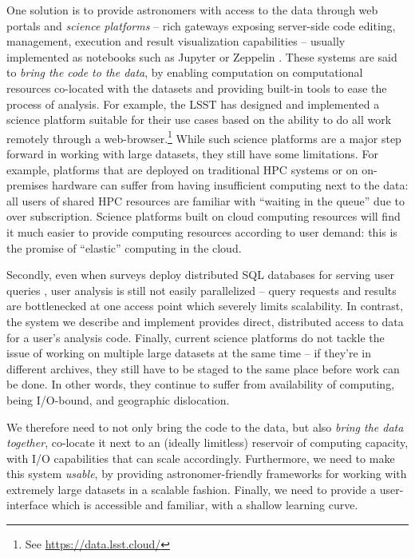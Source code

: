 \documentclass[twocolumn, linenumbers]{aastex631}
\begin{document}
One solution is to provide astronomers with access to the data through web portals and \textit{science platforms} -- rich gateways exposing server-side code editing, management, execution and result visualization capabilities -- usually implemented as notebooks such as Jupyter \citep{jupyter-notebooks} or Zeppelin \citep{zepplin}. These systems are said to {\em bring the code to the data}, by enabling computation on computational resources co-located with the datasets and providing built-in tools to ease the process of analysis. For example, the LSST has designed \citep{LSE-319, LDM-542} and implemented a science platform suitable for their use cases based on the ability to do all work remotely through a web-browser.\footnote{See \url{https://data.lsst.cloud/}} While such science platforms are a major step forward in working with large datasets, they still have some limitations. For example, platforms that are deployed on traditional HPC systems or on on-premises hardware can suffer from having insufficient computing next to the data: all users of shared HPC resources are familiar with ``waiting in the queue'' due to over subscription. Science platforms built on cloud computing resources will find it much easier to provide computing resources according to user demand: this is the promise of ``elastic'' computing in the cloud.

Secondly, even when surveys deploy distributed SQL databases for serving user queries \citep[e.g. Qserv in the case of LSST;][]{qserve}, user analysis is still not easily parallelized -- query requests and results are bottlenecked at one access point which severely limits scalability. In contrast, the system we describe and implement provides direct, distributed access to data for a user’s analysis code. Finally, current science platforms do not tackle the issue of working on multiple large datasets at the same time -- if they're in different archives, they still have to be staged to the same place before work can be done. In other words, they continue to suffer from availability of computing, being I/O-bound, and geographic dislocation.

We therefore need to not only bring the code to the data, but also {\em bring the data together}, co-locate it next to an (ideally limitless) reservoir of computing capacity, with I/O capabilities that can scale accordingly. Furthermore, we need to make this system {\em usable}, by providing astronomer-friendly frameworks for working with extremely large datasets in a scalable fashion. Finally, we need to provide a user-interface which is accessible and familiar, with a shallow learning curve.
\end{document}
